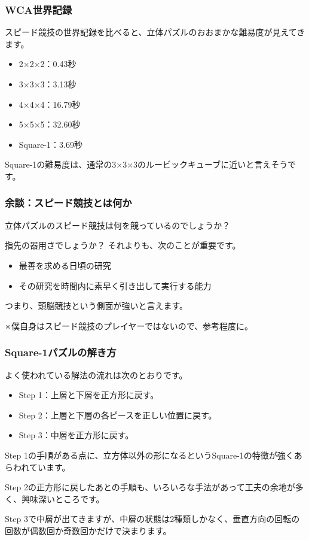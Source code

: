 \documentclass{beamer}
\begin{document}
\begin{frame}
    \frametitle{WCA世界記録}

    スピード競技の世界記録を比べると、立体パズルのおおまかな難易度が見えてきます。

    \begin{itemize}
        \item 2×2×2：0.43秒
        \item 3×3×3：3.13秒
        \item 4×4×4：16.79秒
        \item 5×5×5：32.60秒
        \item Square-1：3.69秒
    \end{itemize}

    Square-1の難易度は、通常の3×3×3のルービックキューブに近いと言えそうです。
\end{frame}

\begin{frame}
    \frametitle{余談：スピード競技とは何か}

    立体パズルのスピード競技は何を競っているのでしょうか？

    指先の器用さでしょうか？ それよりも、次のことが重要です。

    \begin{itemize}
        \item 最善を求める日頃の研究
        \item その研究を時間内に素早く引き出して実行する能力
    \end{itemize}

    つまり、頭脳競技という側面が強いと言えます。

    ※僕自身はスピード競技のプレイヤーではないので、参考程度に。
\end{frame}

\begin{frame}
    \frametitle{Square-1パズルの解き方}

    よく使われている解法の流れは次のとおりです。

    \begin{itemize}
        \item Step 1：上層と下層を正方形に戻す。
        \item Step 2：上層と下層の各ピースを正しい位置に戻す。
        \item Step 3：中層を正方形に戻す。
    \end{itemize}

    Step 1の手順がある点に、立方体以外の形になるというSquare-1の特徴が強くあらわれています。

    Step 2の正方形に戻したあとの手順も、いろいろな手法があって工夫の余地が多く、興味深いところです。

    Step 3で中層が出てきますが、中層の状態は2種類しかなく、垂直方向の回転の回数が偶数回か奇数回かだけで決まります。
\end{frame}
\end{document}
